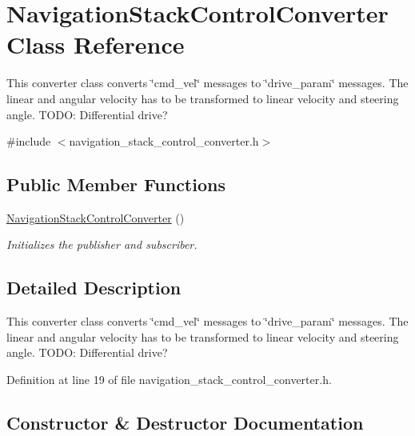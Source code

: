 \hypertarget{class_navigation_stack_control_converter}{}\section{Navigation\+Stack\+Control\+Converter Class Reference}
\label{class_navigation_stack_control_converter}


This converter class converts \char`\"{}cmd\+\_\+vel\char`\"{} messages to \char`\"{}drive\+\_\+param\char`\"{} messages. The linear and angular velocity has to be transformed to linear velocity and steering angle. T\+O\+DO\+: Differential drive?  




{\ttfamily \#include $<$navigation\+\_\+stack\+\_\+control\+\_\+converter.\+h$>$}

\subsection*{Public Member Functions}
\begin{DoxyCompactItemize}
\item 
\hyperlink{class_navigation_stack_control_converter_aaa467e7f68ffb78c9778cdeedc972fac}{Navigation\+Stack\+Control\+Converter} ()
\begin{DoxyCompactList}\small\item\em Initializes the publisher and subscriber. \end{DoxyCompactList}\end{DoxyCompactItemize}


\subsection{Detailed Description}
This converter class converts \char`\"{}cmd\+\_\+vel\char`\"{} messages to \char`\"{}drive\+\_\+param\char`\"{} messages. The linear and angular velocity has to be transformed to linear velocity and steering angle. T\+O\+DO\+: Differential drive? 

Definition at line 19 of file navigation\+\_\+stack\+\_\+control\+\_\+converter.\+h.



\subsection{Constructor \& Destructor Documentation}
